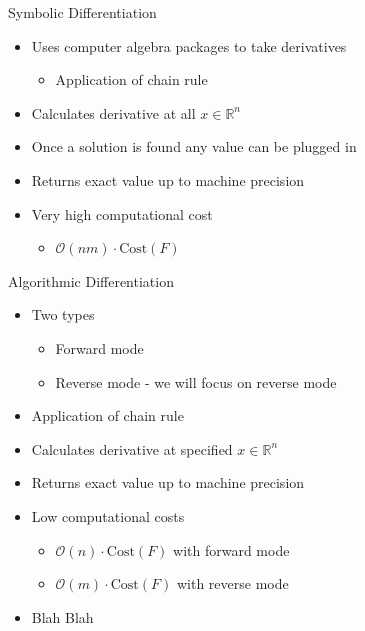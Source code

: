 \documentclass{beamer}
\begin{document}
\begin{frame}{Symbolic Differentiation}
    \begin{itemize}
        \item Uses computer algebra packages to take derivatives
        \begin{itemize}
            \item Application of chain rule
        \end{itemize}
        \item Calculates derivative at all $x \in \mathbb{R}^n$
        \item Once a solution is found any value can be plugged in
        \item Returns \alert{exact} value up to machine precision
        \item Very high computational cost
        \begin{itemize}
            \item $\mathcal{O}(nm) \cdot \text{Cost}(F)$
        \end{itemize}
    \end{itemize}
\end{frame}

\begin{frame}{Algorithmic Differentiation}
    \begin{itemize}
        \item Two types
            \begin{itemize}
                \item Forward mode
                \item Reverse mode - we will focus on reverse mode
            \end{itemize}
        \item Application of chain rule
        \item Calculates derivative at specified $x \in \mathbb{R}^n$
        \item Returns \alert{exact} value up to machine precision
        \item Low computational costs
            \begin{itemize}
                \item $\mathcal{O}(n) \cdot \text{Cost}(F)$ with forward mode
                \item $\mathcal{O}(m) \cdot \text{Cost}(F)$ with reverse mode
            \end{itemize}
        \item<2-> Blah Blah
    \end{itemize}
\end{frame}
\end{document}
